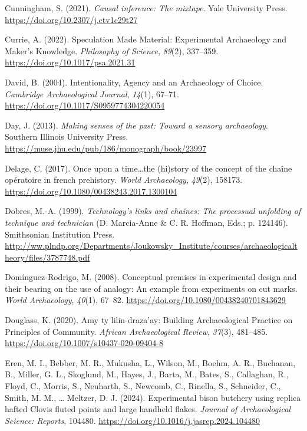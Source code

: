 \documentclass[
  11pt,
  letterpaper,
  DIV=11,
  numbers=noendperiod]{scrartcl}
\newlength{\cslhangindent}
\newenvironment{CSLReferences}[2] %
 {\begin{list}{}{%
  \setlength{\itemindent}{0pt}
  \setlength{\leftmargin}{0pt}
  \setlength{\parsep}{0pt}
  \ifodd #1
   \setlength{\leftmargin}{\cslhangindent}
   \setlength{\itemindent}{-1\cslhangindent}
  \fi
  \setlength{\itemsep}{#2\baselineskip}}}
 {\end{list}}
\begin{document}
\begin{CSLReferences}{1}{0}
Cunningham, S. (2021). \emph{Causal inference: The mixtape}. Yale
University Press. \url{https://doi.org/10.2307/j.ctv1c29t27}

Currie, A. (2022). Speculation Made Material: Experimental Archaeology
and Maker{'}s Knowledge. \emph{Philosophy of Science}, \emph{89}(2),
337--359. \url{https://doi.org/10.1017/psa.2021.31}

David, B. (2004). Intentionality, Agency and an Archaeology of Choice.
\emph{Cambridge Archaeological Journal}, \emph{14}(1), 67--71.
\url{https://doi.org/10.1017/S0959774304220054}

Day, J. (2013). \emph{Making senses of the past: Toward a sensory
archaeology}. Southern Illinois University Press.
\url{https://muse.jhu.edu/pub/186/monograph/book/23997}

Delage, C. (2017). Once upon a time{\ldots{}}the (hi)story of the
concept of the chaîne opératoire in french prehistory. \emph{World
Archaeology}, \emph{49}(2), 158173.
\url{https://doi.org/10.1080/00438243.2017.1300104}

Dobres, M.-A. (1999). \emph{Technology{'}s links and chaînes: The
processual unfolding of technique and technician} (D. Marcia-Anne \& C.
R. Hoffman, Eds.; p. 124146). Smithsonian Institution Press.
\url{http://ww.plndp.org/Departments/Joukowsky_Institute/courses/archaeologicaltheory/files/3787748.pdf}

Domínguez-Rodrigo, M. (2008). Conceptual premises in experimental design
and their bearing on the use of analogy: An example from experiments on
cut marks. \emph{World Archaeology}, \emph{40}(1), 67--82.
\url{https://doi.org/10.1080/00438240701843629}

Douglass, K. (2020). Amy ty lilin-draza{'}ay: Building Archaeological
Practice on Principles of Community. \emph{African Archaeological
Review}, \emph{37}(3), 481--485.
\url{https://doi.org/10.1007/s10437-020-09404-8}

Eren, M. I., Bebber, M. R., Mukusha, L., Wilson, M., Boehm, A. R.,
Buchanan, B., Miller, G. L., Skoglund, M., Hayes, J., Barta, M., Bates,
S., Callaghan, R., Floyd, C., Morris, S., Neuharth, S., Newcomb, C.,
Rinella, S., Schneider, C., Smith, M. M., \ldots{} Meltzer, D. J.
(2024). Experimental bison butchery using replica hafted {Clovis} fluted
points and large handheld flakes. \emph{Journal of Archaeological
Science: Reports}, 104480.
\url{https://doi.org/10.1016/j.jasrep.2024.104480}


\end{CSLReferences}
\end{document}
